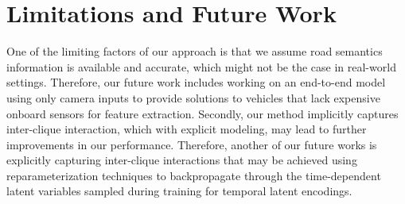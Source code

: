 \documentclass{article}
\begin{document}
\section{Limitations and Future Work}\vspace{-10pt}
One of the limiting factors of our approach is that we assume road semantics information is available and accurate, which might not be the case in real-world settings. Therefore, our future work includes working on an end-to-end model using only camera inputs to provide solutions to vehicles that lack expensive onboard sensors for feature extraction. Secondly, our method implicitly captures inter-clique interaction, which with explicit modeling, may lead to further improvements in our performance. Therefore, another of our future works is explicitly capturing inter-clique interactions that may be achieved using reparameterization techniques to backpropagate through the time-dependent latent variables sampled during training for temporal latent encodings. %
\label{sec:conclusion}


\end{document}
